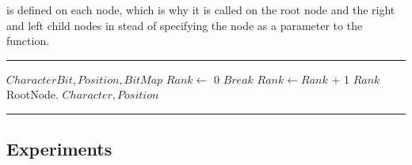 \noindent {} is defined on each node, which is why it is called on the root node and the right and left child nodes in stead of specifying the node as a parameter to the  function.


\noindent\rule{\textwidth}{0.5pt}
\begin{algorithmic} 
 {$CharacterBit, Position, BitMap$}
\State $Rank \gets$ 0
		\State $Break$
	\EndIf
		\State $Rank \gets Rank$ + 1 
	\EndIf
\EndFor
\State \Return $Rank$ 
\EndFunction
\State RootNode. {$Character, Position$}
\end{algorithmic}
\noindent\rule{\textwidth}{0.5pt}
\linebreak

\subsection{Experiments}
